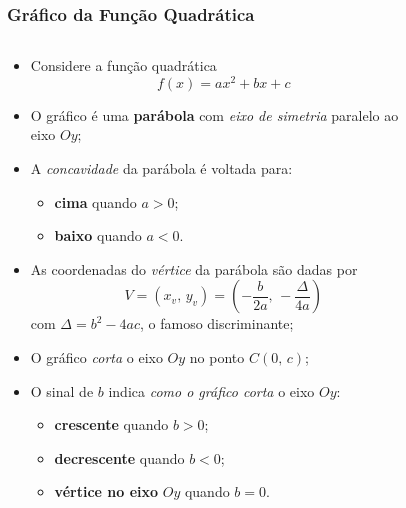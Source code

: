 \begin{frame}
  \frametitle{Gráfico da Função Quadrática}
  \vspace*{-0.69cm}
  \begin{columns}[onlytextwidth]
    \begin{column}{0.74\textwidth}
      \begin{itemize}
        \item< 1- > Considere a função quadrática
        \begin{equation*}
          f(x) = ax^{2} + bx + c
        \end{equation*}
        \item< 2- > O gráfico é uma \textbf{parábola} com \emph{eixo de simetria} paralelo ao eixo $Oy$;
        \item< 3- > A \emph{concavidade} da parábola é voltada para:
        \begin{itemize}
          \item< 3- > \textbf{cima} quando $a > 0$;
          \item< 4- > \textbf{baixo} quando $a < 0$.
        \end{itemize}
        \item< 5- > As coordenadas do \emph{vértice} da parábola são dadas por
        \begin{equation*}
          V = \left(x_{v},\,y_{v}\right) = \left( -\frac{b}{2a},\,-\frac{\Delta}{4a} \right)
        \end{equation*}
        com $\Delta = b^{2} - 4ac$, o famoso discriminante;
        \item< 7- > O gráfico \emph{corta} o eixo $Oy$ no ponto $C(0,\,c)$;
        \item< 9- > O sinal de $b$ indica \emph{como o gráfico corta} o eixo $Oy$:
        \begin{itemize}
          \item< 9- > \textbf{crescente} quando $b > 0$;
          \item< 11- > \textbf{decrescente} quando $b < 0$;
          \item< 13- > \textbf{vértice no eixo} $Oy$ quando $b = 0$.
        \end{itemize}
      \end{itemize}
    \end{column}
    \begin{column}{0.26\textwidth}
      \begin{figure}

\end{figure}
\end{column}
\end{columns}
\end{frame}
